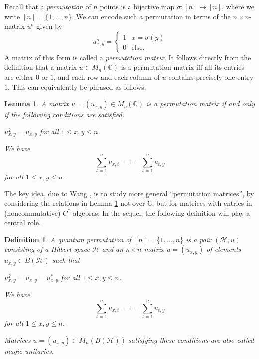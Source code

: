 \documentclass[a4paper]{amsart}
\newcommand*{\Hc}{\mathcal{H}}
\newenvironment{bnum}
{\begin{list}{}
    {\setlength{\labelwidth}{15pt}
     \setlength{\leftmargin}{\labelwidth}
    }
}
{\end{list}}
\numberwithin{equation}{section}
\theoremstyle{change}
\newtheorem{lemma}[theorem]{Lemma}
\newtheorem{definition}[theorem]{Definition}
\begin{document}
Recall that a \emph{permutation} of $ n $ points is a bijective map $ \sigma: [n] \rightarrow [n] $, where we write $ [n] = \{1,\dots, n\} $. We can encode such a permutation in terms of the $ n \times n $-matrix $ u^\sigma $ given by 
$$
u^{\sigma}_{x,y} = 
\begin{cases} 
1 & x = \sigma(y) \\
0 & \text{else.}
\end{cases} 
$$
A matrix of this form is called a \emph{permutation matrix}. It follows directly from the definition that a matrix $ u \in M_n(\mathbb{C}) $ is a permutation 
matrix iff all its entries are either $ 0 $ or $ 1 $, and each row and each column of $ u $ contains precisely one entry $ 1 $. 
This can equivalently be phrased as follows. 

\begin{lemma} \label{permmatrices}
A matrix $ u = (u_{x,y}) \in M_n(\mathbb{C}) $ is a permutation matrix if and only if the following conditions are satisfied.  
\begin{bnum} 
\item[$\bullet$] $ u_{x,y}^2 = u_{x,y} $ for all $ 1 \leq x,y \leq n $.
\item[$\bullet$] We have 
$$ 
\sum_{t = 1}^n u_{x,t} = 1 = \sum_{t = 1}^n u_{t,y} 
$$
for all $ 1 \leq x,y \leq n $. 
\end{bnum}
\end{lemma} 

The key idea, due to Wang \cite{WANG_quantumsymmetry}, is to study more general ``permutation matrices'', by considering the relations in Lemma \ref{permmatrices} not 
over $ \mathbb{C} $, but for matrices with entries in (noncommutative) $ C^* $-algebras. In the sequel, the following definition will play a central role. 

\begin{definition} \label{defqperm} 
A \emph{quantum permutation} of $ [n] = \{1, \dots, n\} $ is a pair $ (\Hc, u) $ consisting of a Hilbert space $ \Hc $ and an $ n \times n $-matrix $ u = (u_{x,y}) $ of 
elements $ u_{x,y} \in B(\Hc) $ such that 
\begin{bnum} 
\item[$\bullet$] $ u_{x,y}^2 = u_{x,y} = u_{x,y}^* $ for all $ 1 \leq x,y \leq n $.
\item[$\bullet$] We have 
$$ 
\sum_{t = 1}^n u_{x,t} = 1 = \sum_{t = 1}^n u_{t,y} 
$$
for all $ 1 \leq x,y\leq n $. 
\end{bnum}
Matrices $ u = (u_{x,y}) \in M_n(B(\Hc)) $ satisfying these conditions are also called \emph{magic unitaries}. 
\end{definition} 
\end{document}
